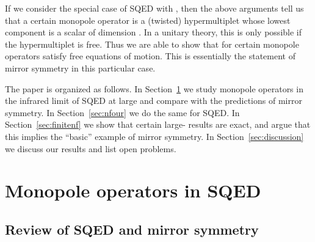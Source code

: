 \documentclass[a4paper,12pt, amsfonts, amssymb]{article}
\begin{document}
If we consider the special case of \coordHE{} SQED with \coordHE{}, then the 
above arguments tell us that 
a certain monopole operator is a (twisted) hypermultiplet whose lowest
component is a scalar of dimension \coordHE{}. In a unitary theory, this is only
possible if the hypermultiplet is free. Thus we are able to show
that for \coordHE{} certain monopole operators satisfy free equations of motion.
This is essentially the statement of mirror symmetry in this 
particular case. 

The paper is organized as follows. In Section~\ref{sec:ntwo} we study monopole
operators in the infrared limit of \coordHE{}  \coordHE{} SQED at large \coordHE{} and 
compare with the predictions of mirror symmetry. In Section~\ref{sec:nfour} 
we do the same for \coordHE{}  \coordHE{} SQED. In Section~\ref{sec:finitenf} we show that certain large-\coordHE{} results are exact, and argue that this implies the ``basic'' example of \coordHE{} mirror symmetry. 
In Section~\ref{sec:discussion} we discuss our results and list open problems. 


\section{Monopole operators in \coordHE{}  \coordHE{} SQED}\label{sec:ntwo}

\subsection{Review of \coordHE{} SQED and \coordHE{} mirror symmetry}
\end{document}
